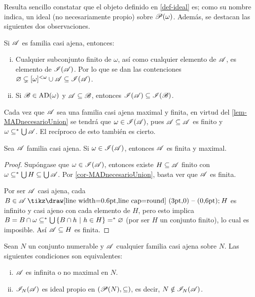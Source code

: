 Resulta sencillo constatar que el objeto definido en \ref{def-ideal} es; como su nombre indica, un ideal (no necesariamente propio) sobre $\mathscr{P}(\omega)$. Además, se destacan las siguientes dos observaciones.

\begin{observacion}\label{obs-IdealPrevia}
	Si $\mathscr{A}$ es familia casi ajena, entonces:
	\begin{enumerate}[i)]
		\item Cualquier subconjunto finito de $\omega$, así como cualquier elemento de $\mathscr{A}$, es elemento de $\mathscr{I}(\mathscr{A})$. Por lo que se dan las contenciones $\varnothing \subsetneq [\omega]^{<\omega} \cup \mathscr{A} \subseteq \mathscr{I}(\mathscr{A})$.
		\item Si $\mathscr{B} \in \operatorname{AD}(\omega)$ y $\mathscr{A} \subseteq \mathscr{B}$, entonces $\mathscr{I}(\mathscr{A}) \subseteq \mathscr{I}(\mathscr{B})$.
	\end{enumerate}
\end{observacion}

Cada vez que $\mathscr{A}$ sea una familia casi ajena maximal y finita, en virtud del \autoref{lem-MADnecesarioUnion} se tendrá que $\omega \in \mathscr{I}(\mathscr{A})$, pues $\mathscr{A} \subseteq \mathscr{A}$ es finito y $\omega \subseteq^* \mbox{$\bigcup$}\, \mathscr{A}$. El recíproco de esto también es cierto.

\begin{proposicion}
	Sea $\mathscr{A}$ familia casi ajena. Si $\omega \in \mathscr{I}(\mathscr{A})$, entonces $\mathscr{A}$ es finita y maximal.
\end{proposicion}

\begin{proof}
	Supóngase que $\omega \in \mathscr{I}(\mathscr{A})$, entonces existe $H \subseteq \mathscr{A}$ finito con $\omega \subseteq^* \mbox{$\bigcup$}\, H \subseteq \mbox{$\bigcup$}\, \mathscr{A}$. Por \ref{cor-MADnecesarioUnion}, basta ver que $\mathscr{A}$ es finita.

	Por ser $\mathscr{A}$ casi ajena, cada $B \in \ms{A} \setminus H$ es infinito y casi ajeno con cada elemento de $H$, pero esto implica $ B = B \cap \omega \subseteq^* \mbox{$\bigcup$}\, \{B \cap h \text{ $|$ } h \in H \} =^* \varnothing $ (por ser $H$ un conjunto finito), lo cual es imposible. Así $\mathscr{A} \subseteq H$ es finita.
\end{proof}

\begin{corolario}\label{cor-IdealPropioCaract}
	Sean $N$ un conjunto numerable y $\mathscr{A}$ cualquier familia casi ajena sobre $N$. Las siguientes condiciones son equivalentes:
	\begin{enumerate}[i)]
		\item $\mathscr{A}$ es infinita o no maximal en $N$.
		\item $\mathscr{I}_N(\mathscr{A})$ es ideal propio en $(\mathscr{P}(N),\subseteq)$, es decir, $N \notin \mathscr{I}_N(\mathscr{A})$.
	\end{enumerate}
\end{corolario}

